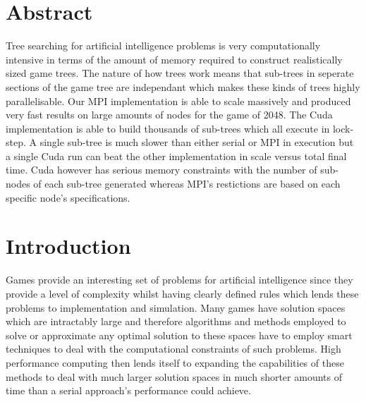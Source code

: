 \documentclass[a4paper]{article}
\begin{document}
\begin{titlepage}

 

\vfill %

\end{titlepage}

\clearpage
\setcounter{page}{1}

\section*{Abstract}
Tree searching for artificial intelligence problems is very computationally intensive in terms of the amount of memory required to construct realistically sized game trees. The nature of how trees work means that sub-trees in seperate sections of the game tree are independant which makes these kinds of trees highly parallelisable. Our MPI implementation is able to scale massively and produced very fast results on large amounts of nodes for the game of 2048. The Cuda implementation is able to build thousands of sub-trees which all execute in lock-step. A single sub-tree is much slower than either serial or MPI in execution but a single Cuda run can beat the other implementation in scale versus total final time. Cuda however has serious memory constraints with the number of sub-nodes of each sub-tree generated whereas MPI's restictions are based on each specific node's specifications.

\section{Introduction}
Games provide an interesting set of problems for artificial intelligence since they provide a level of complexity whilst having clearly defined rules which lends these problems to implementation and simulation. Many games have solution spaces which are intractably large and therefore algorithms and methods employed to solve or approximate any optimal solution to these spaces have to employ smart techniques to deal with the computational constraints of such problems. High performance computing then lends itself to expanding the capabilities of these methods to deal with much larger solution spaces in much shorter amounts of time than a serial approach’s performance could achieve. \cite{AIModern}
\end{document}
